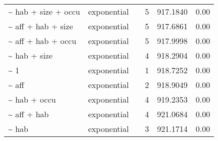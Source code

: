 \begin{table}[ht]
\begin{tabular}{llrrrr}
  \~{} hab + size + occu & exponential &  & 5 & 917.1840 & 0.00 \\ 
  \~{} aff + hab + size & exponential &  & 5 & 917.6861 & 0.00 \\ 
  \~{} aff + hab + occu & exponential &  & 5 & 917.9998 & 0.00 \\ 
  \~{} hab + size & exponential &  & 4 & 918.2904 & 0.00 \\ 
  \~{} 1 & exponential &  & 1 & 918.7252 & 0.00 \\ 
  \~{} aff & exponential &  & 2 & 918.9049 & 0.00 \\ 
  \~{} hab + occu & exponential &  & 4 & 919.2353 & 0.00 \\ 
  \~{} aff + hab & exponential &  & 4 & 921.0684 & 0.00 \\ 
  \~{} hab & exponential &  & 3 & 921.1714 & 0.00 \\ 
  \end{tabular}
\label{tab:mod}
\end{table}
